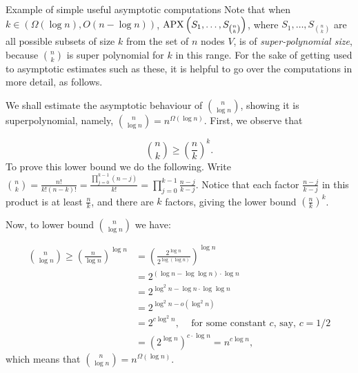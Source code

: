 \begin{trailer}{Example of simple useful asymptotic computations}
Note that when $k\in(\Omega(\log n),O(n-\log n))$, $\mathrm{APX}\left(S_1, \ldots, S_{n\choose k}\right)$, where $S_1,\dots,S_{n\choose k}$ are all possible subsets of size $k$ from the set of $n$ nodes $V$, is of \emph{super-polynomial size}, because $ n\choose k$ is super polynomial for $k$ in this range. For the sake of getting used to asymptotic estimates such as these, it is helpful to go over the computations in more detail, as follows.

We shall estimate the asymptotic behaviour of $\binom{n}{\log n} $, showing it is superpolynomial, namely, $\binom{n}{\log n} =
n^{\Omega(\log n)}$. First, we observe that

$$\binom{n}{k} \ge\left(\frac{n}{k}\right)^k. $$
To prove this lower bound we do the following.
Write $\binom{n}{k}=\frac{n!}{k!(n-k)!}=
\frac{\prod_{j=0}^{k-1}(n-j)}{k!}=\prod_{j=0}^{k-1} \frac{n-j}{k-j}$. Notice that each factor $\frac{n-j}{k-j}$ in this product is at least $\frac{n}{k}$, and there are $k$ factors, giving the lower bound $\left(\frac{n}{k}\right)^k$. 

Now, to lower bound $\binom{n}{\log n} $ we have:

\[  
\begin{aligned}
 \binom{n}{\log n} \geq\left(\frac{n}{\log n}\right)^{\log n}
& =
\left(
    \frac{2^{\log n}}
        {2^{\log (\log n)}}\right)^{\log n} \\
& =2^{(\log n-\log \log n) \cdot \log n} \\
& =2^{\log^2n-\log n \cdot \log \log n} \\
& =2^{\log ^2 n-o(\log ^2n)} \\
& = 2^{c \log ^2 n} \text {, ~~~for some constant $c$, say, $c=1/2$} \\
& =\left(2^{\log n}\right)^{c \cdot \log n}=
n^{c \log n},
\end{aligned}
\]
which means that $\binom{n}{\log n}= n^{\Omega(\log n)}$.





\end{trailer}
